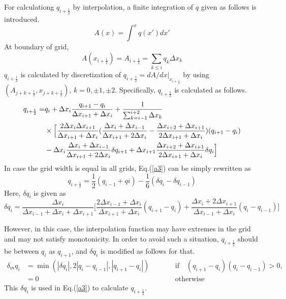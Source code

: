 \documentclass{article}
\begin{document}
For calculationg $q_{i+\frac{1}{2}}$ by interpolation, a finite integration of $q$ given as follows is introduced. 
\begin{equation}
  A(x)= \int^{x} q(x') dx'
\end{equation}
At boundary of grid,
\begin{equation}
A(x_{i+\frac{1}{2}})=A_{i+\frac{1}{2}}=\sum_{k\leq i}q_{k}\Delta x_{k}  
\end{equation}
$q_{i+\frac{1}{2}}$ is calculated by discretization of $q_{i+\frac{1}{2}}=dA/dx |_{x_{i+\frac{1}{2}}}$ by using $(A_{j+k+\frac{1}{2}},x_{j+k+\frac{1}{2}})$, $k=0,\pm 1, \pm 2$.
Specifically, $q_{i+\frac{1}{2}}$ is calculated as follows.
\begin{equation}
  \label{a3}
  \begin{split}
    q_{i+\frac{1}{2}}=&q_{i}+\Delta x_{i} \frac{q_{i+1}-q_{i}}{\Delta x_{i+1}+\Delta x_{i}}+\frac{1}{\sum_{k=i-1}^{i+2}\Delta x_{k}}\\
    &\times \Bigl[\frac{2\Delta x_{i}\Delta x_{i+1}}{\Delta x_{i+1}+\Delta x_{i}}(\frac{\Delta x_{i}+\Delta x_{i-1}}{\Delta x_{i+1}+2\Delta x_{i}}-\frac{\Delta x_{i+2}+\Delta x_{i+1}}{2\Delta x_{i+1}+\Delta x_{i}})(q_{i+1}-q_{i})\\
     & -\Delta x_{i}\frac{\Delta x_{i}+\Delta x_{i-1}}{\Delta x_{i+1}+2\Delta x_{i}} \delta q_{i+1}+\Delta x_{i+1} \frac{\Delta x_{i+2}+\Delta x_{i+1}}{2\Delta x_{i+1}+\Delta x_{i}} \delta q_{i}\Bigr]
  \end{split}
\end{equation}
In case the grid width is equal in all grids, Eq.(\ref{a3}) can be simply rewritten as
\begin{equation}
  q_{i+\frac{1}{2}}=\frac{1}{2}(q_{i-1}+q{i})-\frac{1}{6}(\delta q_{i}-\delta q_{i-1})
\end{equation}
Here, $\delta q_{i}$ is given as
\begin{equation}
  \delta q_{i}=\frac{\Delta x_{i}}{\Delta x_{i-1}+\Delta x_{i}+\Delta x_{i+1}}\biggl[\frac{2\Delta x_{i-1}+\Delta x_{i}}{\Delta x_{i+1}+\Delta x_{i}}(q_{i+1}-q_{i})+\frac{\Delta x_{i}+2\Delta x_{i+1}}{\Delta x_{i-1}+\Delta x_{i}}(q_{i}-q_{i-1})\biggr]
\end{equation}

However, in this case, the interpolation function may have extremes in the grid and may not satisfy monotonicity.
In order to avoid such a situation, $q_{i+\frac{1}{2}}$ should be between $q_{i}$ as $q_{i+1}$, and $\delta q_{i}$ is modified as follows for that. 
\begin{equation}
  \begin{aligned}
    \delta_{m} q_{i} & =\min(|\delta
    q_{i}|,2|q_{i}-q_{i-1}|,|q_{i+1}-q_{i}|) && \qquad \text{if$\quad(q_{i+1}-q_{i})(q_{i}-q_{i-1}) >0$}, \\
    & =0 && \qquad \text{otherwise}
  \end{aligned}
\end{equation}
This $\delta q_{i}$ is used in Eq.(\ref{a3}) to calculate $q_{i+\frac{1}{2}}$.
\end{document}
